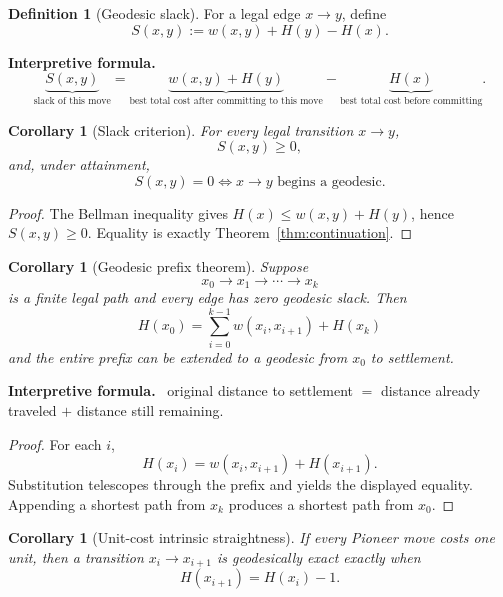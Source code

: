 \documentclass[11pt]{article}
\newtheorem{corollary}[theorem]{Corollary}
\theoremstyle{definition}
\newtheorem{definition}[theorem]{Definition}
\theoremstyle{remark}
\newcommand{\Slack}{S}
\newenvironment{interpretiveformula}{%
  \begin{center}\begin{minipage}{0.92\textwidth}\small
  \textbf{Interpretive formula.}\ }{\end{minipage}\end{center}}
\begin{document}
\begin{definition}[Geodesic slack]
For a legal edge $x\to y$, define
\[
\Slack(x,y):=w(x,y)+H(y)-H(x).
\]
\end{definition}

\begin{interpretiveformula}
\[
\underbrace{\Slack(x,y)}_{\text{slack of this move}}
=
\underbrace{w(x,y)+H(y)}_{\text{best total cost after committing to this move}}
-
\underbrace{H(x)}_{\text{best total cost before committing}}.
\]
\end{interpretiveformula}

\begin{corollary}[Slack criterion]
For every legal transition $x\to y$,
\[
\Slack(x,y)\ge 0,
\]
and, under attainment,
\[
\Slack(x,y)=0
\iff
x\to y\text{ begins a geodesic}.
\]
\end{corollary}

\begin{proof}
The Bellman inequality gives $H(x)\le w(x,y)+H(y)$, hence $\Slack(x,y)\ge0$. Equality is exactly Theorem~\ref{thm:continuation}.
\end{proof}

\begin{corollary}[Geodesic prefix theorem]\label{cor:prefix}
Suppose
\[
x_0\to x_1\to\cdots\to x_k
\]
is a finite legal path and every edge has zero geodesic slack. Then
\[
\boxed{
H(x_0)=\sum_{i=0}^{k-1}w(x_i,x_{i+1})+H(x_k)
}
\]
and the entire prefix can be extended to a geodesic from $x_0$ to settlement.
\end{corollary}

\begin{interpretiveformula}
original distance to settlement $=$ distance already traveled $+$ distance still remaining.
\end{interpretiveformula}

\begin{proof}
For each $i$,
\[
H(x_i)=w(x_i,x_{i+1})+H(x_{i+1}).
\]
Substitution telescopes through the prefix and yields the displayed equality. Appending a shortest path from $x_k$ produces a shortest path from $x_0$.
\end{proof}

\begin{corollary}[Unit-cost intrinsic straightness]
If every Pioneer move costs one unit, then a transition $x_i\to x_{i+1}$ is geodesically exact exactly when
\[
H(x_{i+1})=H(x_i)-1.
\]
\end{corollary}
\end{document}
